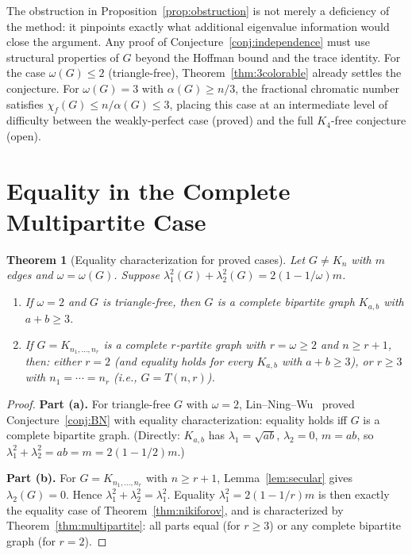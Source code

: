 \documentclass[preprint,12pt]{elsarticle}
\theoremstyle{plain}
\newtheorem{theorem}{Theorem}[section]
\theoremstyle{definition}
\begin{document}
The obstruction in Proposition~\ref{prop:obstruction} is not merely a
deficiency of the method: it pinpoints exactly what additional eigenvalue
information would close the argument.
Any proof of Conjecture~\ref{conj:independence} must use structural
properties of $G$ beyond the Hoffman bound and the trace identity.
For the case $\omega(G) \leq 2$ (triangle-free), Theorem~\ref{thm:3colorable}
already settles the conjecture.
For $\omega(G) = 3$ with $\alpha(G) \geq n/3$, the fractional chromatic
number satisfies $\chi_f(G) \leq n/\alpha(G) \leq 3$, placing this case
at an intermediate level of difficulty between the weakly-perfect case
(proved) and the full $K_4$-free conjecture (open).

\section{Equality in the Complete Multipartite Case}
\label{sec:equality}

\begin{theorem}[Equality characterization for proved cases]
  \label{thm:equality}
  Let $G \neq K_n$ with $m$ edges and $\omega = \omega(G)$.
  Suppose $\lambda_1^2(G) + \lambda_2^2(G) = 2(1 - 1/\omega)m$.
  \begin{enumerate}[label=(\alph*)]
    \item If $\omega = 2$ and $G$ is triangle-free, then $G$ is a complete
          bipartite graph $K_{a,b}$ with $a + b \geq 3$.
    \item If $G = K_{n_1,\ldots,n_r}$ is a complete $r$-partite graph
          with $r = \omega \geq 2$ and $n \geq r+1$, then:
          either $r = 2$ (and equality holds for every $K_{a,b}$ with
          $a+b\geq 3$), or $r \geq 3$ with $n_1 = \cdots = n_r$ (i.e.,
          $G = T(n,r)$).
  \end{enumerate}
\end{theorem}

\begin{proof}
\textbf{Part (a).}
For triangle-free $G$ with $\omega = 2$, Lin--Ning--Wu~\cite{LinNingWu2021}
proved Conjecture~\ref{conj:BN} with equality characterization:
equality holds iff $G$ is a complete bipartite graph.
(Directly: $K_{a,b}$ has $\lambda_1 = \sqrt{ab}$, $\lambda_2 = 0$,
$m = ab$, so $\lambda_1^2 + \lambda_2^2 = ab = m = 2(1-1/2)m$.)

\textbf{Part (b).}
For $G = K_{n_1,\ldots,n_r}$ with $n \geq r+1$, Lemma~\ref{lem:secular}
gives $\lambda_2(G) = 0$.  Hence $\lambda_1^2 + \lambda_2^2 = \lambda_1^2$.
Equality $\lambda_1^2 = 2(1-1/r)m$ is then exactly the equality case of
Theorem~\ref{thm:nikiforov}, and is characterized by
Theorem~\ref{thm:multipartite}: all parts equal (for $r \geq 3$) or any
complete bipartite graph (for $r = 2$).
\end{proof}
\end{document}
